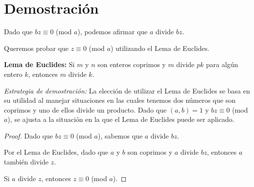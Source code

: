 \documentclass{article}
\begin{document}
\section*{Demostración}
Dado que \( bz \equiv 0 \) (mod \( a \)), podemos afirmar que \( a \) divide \( bz \).

Queremos probar que \( z \equiv 0 \) (mod \( a \)) utilizando el Lema de Euclides.

\textbf{Lema de Euclides:} Si \( m \) y \( n \) son enteros coprimos y \( m \) divide \( pk \) para algún entero \( k \), entonces \( m \) divide \( k \).

\textit{Estrategia de demostración:} La elección de utilizar el Lema de Euclides se basa en su utilidad al manejar situaciones en las cuales tenemos dos números que son coprimos y uno de ellos divide un producto. Dado que \( (a, b) = 1 \) y \( bz \equiv 0 \) (mod \( a \)), se ajusta a la situación en la que el Lema de Euclides puede ser aplicado.

\begin{proof}
Dado que \( bz \equiv 0 \) (mod \( a \)), sabemos que \( a \) divide \( bz \).

Por el Lema de Euclides, dado que \( a \) y \( b \) son coprimos y \( a \) divide \( bz \), entonces \( a \) también divide \( z \).

Si \( a \) divide \( z \), entonces \( z \equiv 0 \) (mod \( a \)). 
\end{proof}
\end{document}
